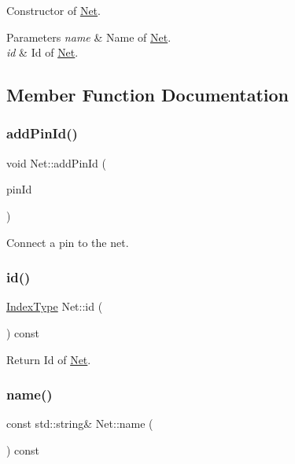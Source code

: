 Constructor of \hyperlink{classNet}{Net}. 


\begin{DoxyParams}{Parameters}
{\em name} & Name of \hyperlink{classNet}{Net}. \\
\hline
{\em id} & Id of \hyperlink{classNet}{Net}. \\
\hline
\end{DoxyParams}


\subsection{Member Function Documentation}
\mbox{\label{classNet_abe94a5298df3441a8b45c68d3f3b16df}} 
\subsubsection{\texorpdfstring{add\+Pin\+Id()}{addPinId()}}
{\footnotesize\ttfamily void Net\+::add\+Pin\+Id (\begin{DoxyParamCaption}\item[{\hyperlink{type_8h_a581e8093e28e7362f2b6937296190676}{Index\+Type}}]{pin\+Id }\end{DoxyParamCaption})\hspace{0.3cm}{\ttfamily [inline]}}

Connect a pin to the net. \mbox{\label{classNet_a4a27de129427445971fcb3a274bad711}} 
\subsubsection{\texorpdfstring{id()}{id()}}
{\footnotesize\ttfamily \hyperlink{type_8h_a581e8093e28e7362f2b6937296190676}{Index\+Type} Net\+::id (\begin{DoxyParamCaption}{ }\end{DoxyParamCaption}) const\hspace{0.3cm}{\ttfamily [inline]}}

Return Id of \hyperlink{classNet}{Net}. \mbox{\label{classNet_a1782a27bedb6c07e8406d93182107d0f}} 
\subsubsection{\texorpdfstring{name()}{name()}}
{\footnotesize\ttfamily const std\+::string\& Net\+::name (\begin{DoxyParamCaption}{ }\end{DoxyParamCaption}) const\hspace{0.3cm}{\ttfamily [inline]}}

